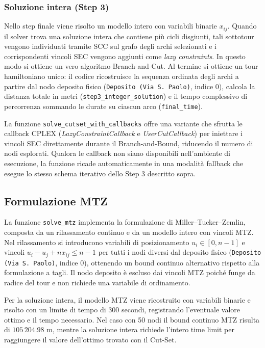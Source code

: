 \documentclass[a4paper,12pt]{article}
\begin{document}
\subsubsection*{Soluzione intera (Step 3)}

Nello step finale viene risolto un modello intero con variabili binarie $x_{ij}$. Quando il solver trova una soluzione intera che contiene più cicli disgiunti, tali sottotour vengono individuati tramite SCC sul grafo degli archi selezionati e i corrispondenti vincoli SEC vengono aggiunti come \textit{lazy constraints}. In questo modo si ottiene un vero algoritmo Branch-and-Cut.
Al termine si ottiene un tour hamiltoniano unico: il codice ricostruisce la sequenza ordinata degli archi a partire dal nodo deposito fisico (\texttt{Deposito (Via S. Paolo)}, indice 0), calcola la distanza totale in metri (\texttt{step3\_integer\_solution}) e il tempo complessivo di percorrenza sommando le durate su ciascun arco (\texttt{final\_time}).

La funzione \texttt{solve\_cutset\_with\_callbacks} offre una variante che sfrutta le callback CPLEX (\textit{LazyConstraintCallback} e \textit{UserCutCallback}) per iniettare i vincoli SEC direttamente durante il Branch-and-Bound, riducendo il numero di nodi esplorati. Qualora le callback non siano disponibili nell'ambiente di esecuzione, la funzione ricade automaticamente in una modalità fallback che esegue lo stesso schema iterativo dello Step 3 descritto sopra.

\subsection{Formulazione MTZ}

La funzione \texttt{solve\_mtz} implementa la formulazione di Miller–Tucker–Zemlin, composta da un rilassamento continuo e da un modello intero con vincoli MTZ.
Nel rilassamento si introducono variabili di posizionamento \(u_i\in[0,n-1]\) e vincoli \(u_i - u_j + n x_{ij} \le n-1\) per tutti i nodi diversi dal deposito fisico (\texttt{Deposito (Via S. Paolo)}, indice 0), ottenendo un bound continuo alternativo rispetto alla formulazione a tagli. Il nodo deposito è escluso dai vincoli MTZ poiché funge da radice del tour e non richiede una variabile di ordinamento.

Per la soluzione intera, il modello MTZ viene ricostruito con variabili binarie e risolto con un limite di tempo di 300 secondi, registrando l’eventuale valore ottimo e il tempo necessario.
Nel caso con 50 nodi il bound continuo MTZ risulta di \(105\,204.98\) m, mentre la soluzione intera richiede l’intero time limit per raggiungere il valore dell’ottimo trovato con il Cut-Set.
\end{document}
